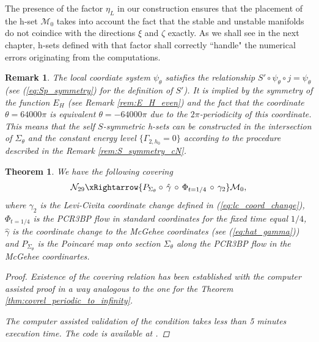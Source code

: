 \documentclass[1p]{article}
\newtheorem{theorem}{Theorem}
\newtheorem{remark}{Remark}
\begin{document}
The presence of the factor $\eta_{L}$ in our construction ensures that the placement of the h-set $\mathcal{M}_0$ takes into account the fact that the stable and unstable manifolds do not coindice with the directions $\xi$ and $\zeta$ exactly. As we shall see in the next chapter, h-sets defined with that factor shall correctly ``handle" the numerical errors originating from the computations.

\begin{remark}
    \label{rem:psi_theta_S_symmetry}
    The local coordiate system $\psi_\theta$ satisfies the relationship $S' \circ \psi_\theta \circ j = \psi_\theta$ (see (\ref{eq:Sp_symmetry}) for the definition of $S'$). It is implied by the symmetry of the function $E_H$ (see Remark \ref{rem:E_H_even}) and the fact that the coordinate $\theta = 64000\pi$ is equivalent $\theta = -64000\pi$ due to the $2\pi$-periodicity of this coordinate. This means that the self $S$-symmetric h-sets can be constructed in the intersection of $\Sigma_\theta$ and the constant energy level $\{ \Gamma_{2,h_0} = 0 \}$ according to the procedure described in the Remark \ref{rem:S_symmetry_cN}.
\end{remark}

\begin{theorem}
    \label{thm:covrel_jump_to_infinity}
    We have the following covering
    \begin{equation}
        \label{eq:covrel_jump_to_infinity}
        \mathcal{N}_{29} \xRightarrow{ P_{\Sigma_\theta} \circ\, \hat{\gamma} \,\circ\, \Phi_{t=1/4} \,\circ\, \gamma_2 } \mathcal{M}_0,
    \end{equation}
    where $\gamma_2$ is the Levi-Civita coordinate change defined in (\ref{eq:lc_coord_change}), $\Phi_{t=1/4}$ is the PCR3BP flow in standard coordinates for the fixed time equal $1/4$, $\hat{\gamma}$ is the coordinate change to the McGehee coordinates (see (\ref{eq:hat_gamma})) and $P_{\Sigma_\theta}$ is the Poincar\'e map onto section $\Sigma_\theta$ along the PCR3BP flow in the McGehee coordinartes.
    \begin{proof}
        Existence of the covering relation has been established with the computer assisted proof in a way analogous to the one for the Theorem \ref{thm:covrel_periodic_to_infinity}.

        The computer assisted validation of the condition takes less than 5 minutes execution time. The code is available at \cite{pcr3bp_code}. 
    \end{proof}
\end{theorem}
\end{document}
